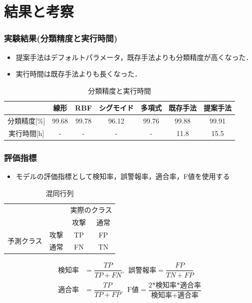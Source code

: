 \documentclass[11pt,dvipdfmx,cjk]{beamer}
\begin{document}
\section{結果と考察}
\begin{frame}
  \frametitle{実験結果(分類精度と実行時間)}
  \begin{itemize}
  \item 提案手法はデフォルトパラメータ，既存手法よりも分類精度が高くなった．
  \item 実行時間は既存手法よりも長くなった．
  \end{itemize}
  \begin{table}[b]
    \scriptsize
    \centering
    \caption{分類精度と実行時間}  %
    \begin{tabular}{|c|c|c|c|c|c|c|}  %
        \hline  %
        ~ & 線形 &RBF &シグモイド&多項式&既存手法 & 提案手法\\  %
        \hline  %
        分類精度[\%]& 99.68&99.78&96.12&99.76&99.88& 99.91\\  %
        \hline  %
        実行時間[h] & - & -&-&-&11.8& 15.5\\  %
        \hline  %
    \end{tabular}
  \end{table}
\end{frame}

\begin{frame}
  \frametitle{評価指標}
  \begin{itemize}
    \item  モデルの評価指標として検知率，誤警報率，適合率，F値を使用する
  \end{itemize}
  \begin{table}[h]
    \centering
    \caption{混同行列}
    \begin{tabular}{c|c|c|c|}
        \multicolumn{2}{c}{} & \multicolumn{2}{c}{実際のクラス} \\ \cline{3-4}
        \multicolumn{2}{c|}{} & 攻撃& 通常\\ \cline{2-4}
        \multirow{2}{*}{予測クラス} 
        & 攻撃 & TP & FP \\ \cline{2-4}
        & 通常 & FN & TN\\ \cline{2-4}
    \end{tabular}
    \label{tab:confusion_matrix}
\end{table}
\setlength{\jot}{12pt}
\begin{align*}
\text{検知率} &= \dfrac{TP}{TP + FN},~~\text{誤警報率} = \dfrac{FP}{TN + FP}\\
\text{適合率} &= \dfrac{TP}{TP + FP},~~\text{F値} = \dfrac{2\text{*検知率*適合率}}{\text{検知率}+\text{適合率}}
\end{align*}
\end{frame}
\end{document}
